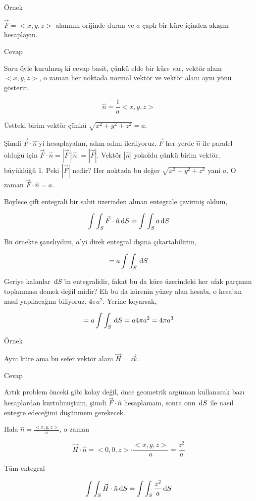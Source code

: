\documentclass[12pt,fleqn]{article}\usepackage{../../common}
\begin{document}
Örnek

$\vec{F} = < x,y,z >$ alanının orijinde duran ve $a$ çaplı bir küre içinden
akışını hesaplayın.

Cevap

Soru öyle kurulmuş ki cevap basit, çünkü elde bir küre var, vektör alanı
$< x,y,z >$, o zaman her noktada normal vektör ve vektör alanı aynı yönü gösterir.

$$
\hat{n} = \frac{1}{a} < x,y,z >
$$

Üstteki birim vektör çünkü $\sqrt{x^2 + y^2 + z^2} = a$.

Şimdi $\vec{F} \cdot \hat{n}$'yi hesaplayalım, adım adım ilerliyoruz,
$\vec{F}$ her yerde $\hat{n}$ ile paralel olduğu için
$\vec{F} \cdot \hat{n} = |\vec{F}| |\hat{n}| = |\vec{F}|$. Vektör $|\hat{n}|$
yokoldu çünkü birim vektör, büyüklüğü 1. Peki $|\vec{F}|$ nedir? Her
noktada bu değer $\sqrt{x^2 + y^2 + z^2}$ yani $a$. O zaman
$\vec{F} \cdot \hat{n} = a$.

Böylece çift entegrali bir sabit üzerinden alınan entegrale çevirmiş oldum,

$$
\int \int_S \vec{F} \cdot \hat{n} \,\mathrm{d} S =
\int \int_S a \,\mathrm{d} S
$$

Bu örnekte şanslıydım, $a$'yi direk entegral dışına çıkartabilirim,

$$
= a \int \int_S \,\mathrm{d} S
$$

Geriye kalanlar $\,\mathrm{d} S$'in entegralidir, fakat bu da küre üzerindeki her ufak
parçanın toplanması demek değil midir? Eh bu da kürenin yüzey alan hesabı, o
hesabın nasıl yapılacağını biliyoruz, $4 \pi a^2$. Yerine koyarsak,

$$
= a \int \int_S \,\mathrm{d} S = a 4 \pi a^2 = 4 \pi a^3
$$

Örnek

Aynı küre ama bu sefer vektör alanı $\vec{H} = z \hat{k}$.

Cevap

Artık problem önceki gibi kolay değil, önce geometrik argüman kullanarak bazı
hesaplardan kurtulmuştum, şimdi $\vec{F} \cdot \hat{n}$ hesaplamam, sonra onu
$\,\mathrm{d} S$ ile nasıl entegre edeceğimi düşünmem gerekecek.

Hala $\hat{n} = \frac{ < x,y,z >}{a}$, o zaman

$$
\vec{H} \cdot \hat{n} = < 0,0,z > \cdot \frac{ < x,y,z >}{a} = \frac{z^2}{a}
$$

Tüm entegral

$$
\int \int_S \vec{H} \cdot \hat{n} \,\mathrm{d} S =
\int \int_S \frac{z^2}{a} \,\mathrm{d} S
$$
\end{document}
